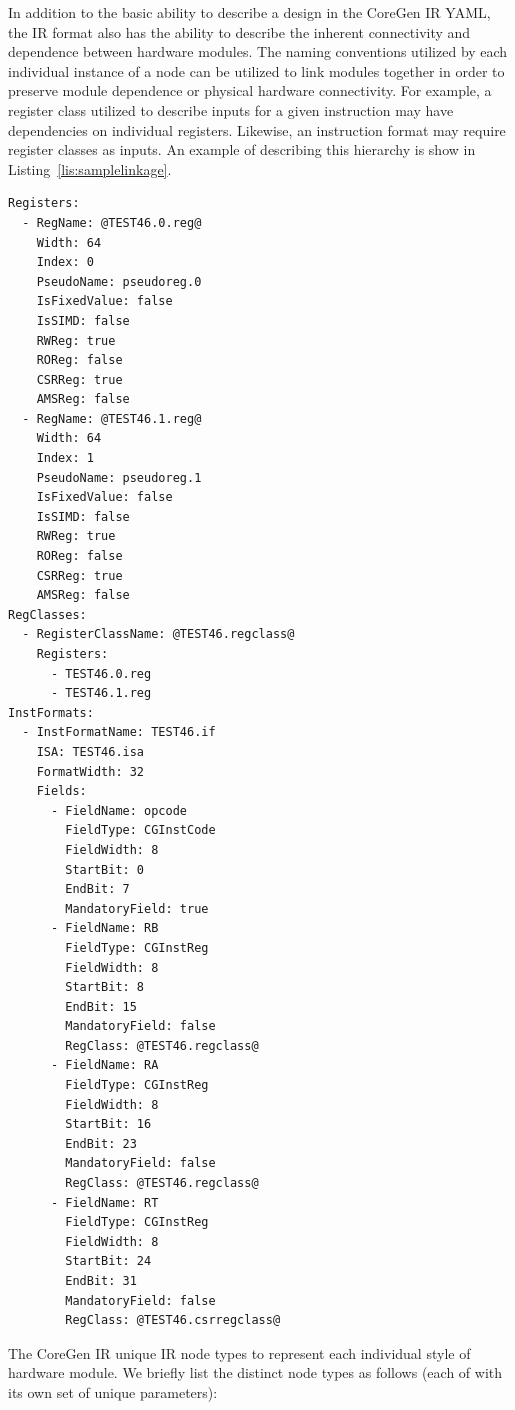 \documentclass{article}
\begin{document}
In addition to the basic ability to describe a design in the CoreGen IR YAML, 
the IR format also has the ability to describe the inherent connectivity 
and dependence between hardware modules.  The naming conventions 
utilized by each individual instance of a node can be utilized to link 
modules together in order to preserve module dependence or physical 
hardware connectivity.  For example, a register class utilized to describe 
inputs for a given instruction may have dependencies on individual registers.  
Likewise, an instruction format may require register classes as inputs.  An example 
of describing this hierarchy is show in Listing~\ref{lis:samplelinkage}.  

\vspace{0.125in}
\begin{lstlisting}[frame=single,style=base,caption={Example IR Node Linkage},captionpos=b,label={lis:samplelinkage}]
Registers:
  - RegName: @TEST46.0.reg@
    Width: 64
    Index: 0
    PseudoName: pseudoreg.0
    IsFixedValue: false
    IsSIMD: false
    RWReg: true
    ROReg: false
    CSRReg: true
    AMSReg: false
  - RegName: @TEST46.1.reg@
    Width: 64
    Index: 1
    PseudoName: pseudoreg.1
    IsFixedValue: false
    IsSIMD: false
    RWReg: true
    ROReg: false
    CSRReg: true
    AMSReg: false
RegClasses:
  - RegisterClassName: @TEST46.regclass@
    Registers:
      - TEST46.0.reg
      - TEST46.1.reg
InstFormats:
  - InstFormatName: TEST46.if
    ISA: TEST46.isa
    FormatWidth: 32
    Fields:
      - FieldName: opcode
        FieldType: CGInstCode
        FieldWidth: 8
        StartBit: 0
        EndBit: 7
        MandatoryField: true
      - FieldName: RB
        FieldType: CGInstReg
        FieldWidth: 8
        StartBit: 8
        EndBit: 15
        MandatoryField: false
        RegClass: @TEST46.regclass@
      - FieldName: RA
        FieldType: CGInstReg
        FieldWidth: 8
        StartBit: 16
        EndBit: 23
        MandatoryField: false
        RegClass: @TEST46.regclass@
      - FieldName: RT
        FieldType: CGInstReg
        FieldWidth: 8
        StartBit: 24
        EndBit: 31
        MandatoryField: false
        RegClass: @TEST46.csrregclass@
\end{lstlisting}  

The CoreGen IR unique IR node types to represent each individual style of hardware module.  
We briefly list the distinct node types as follows (each of with its own set of unique parameters): 
\end{document}

